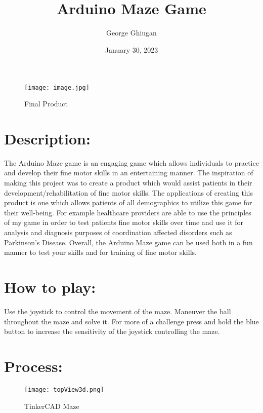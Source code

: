 \documentclass[12pt]{article}
\title{ \\ \Large \textbf{Arduino Maze Game}}
\author{George Ghiugan}
\date{January 30, 2023}
\begin{document}
\maketitle

\begin{figure}[H]
    \centering
    \texttt{[image: image.jpg]}
    \caption{Final Product}
    \label{fig:enter-label}
\end{figure}

\section*{Description:}

The Arduino Maze game is an engaging game which allows individuals to practice and develop their fine motor skills in an entertaining manner. The inspiration of making this project was to create a product which would assist patients in their development/rehabilitation of fine motor skills. The applications of creating this product is one which allows patients of all demographics to utilize this game for their well-being. For example healthcare providers are able to use the principles of my game in order to test patients fine motor skills over time and use it for analysis and diagnosis purposes of coordination affected disorders such as Parkinson's Disease. Overall, the Arduino Maze game can be used both in a fun manner to test your skills and for training of fine motor skills.


\section*{How to play:}
Use the joystick to control the movement of the maze. Maneuver the ball throughout the maze and solve it. For more of a challenge press and hold the blue button to increase the sensitivity of the joystick controlling the maze.

\section*{Process:}

\begin{figure}[H]
    \centering
    \texttt{[image: topView3d.png]}
    \caption{TinkerCAD Maze}
    \label{fig:enter-label}
\end{figure}
\end{document}
